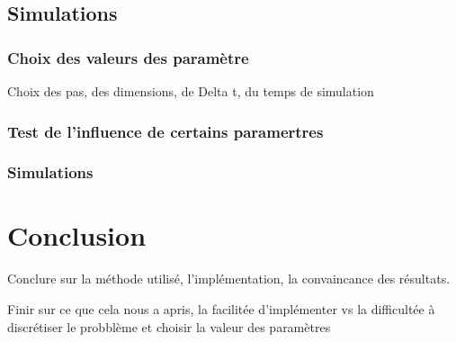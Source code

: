 \documentclass[fleqn]{article}
\begin{document}
\subsection{Simulations}
\subsubsection{Choix des valeurs des paramètre}
Choix des pas, des dimensions, de Delta t, du temps de simulation
\subsubsection{Test de l'influence de certains paramertres}
\subsubsection{Simulations}

\newpage
\section{Conclusion}
Conclure sur la méthode utilisé, l'implémentation, la convaincance des résultats.

Finir sur ce que cela nous a apris, la facilitée d'implémenter vs la difficultée à discrétiser le probblème et choisir la valeur des paramètres
\end{document}
